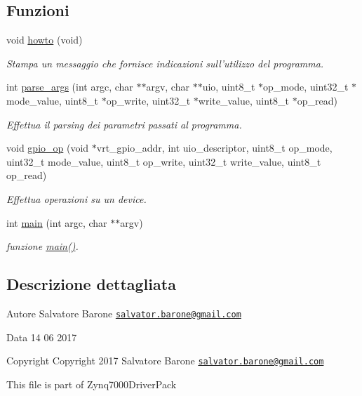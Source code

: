 \subsection*{Funzioni}
\begin{DoxyCompactItemize}
\item 
void \hyperlink{group___u_i_o-interrupt_ga05909651fa170a63e98e3f8e13451b7b}{howto} (void)
\begin{DoxyCompactList}\small\item\em Stampa un messaggio che fornisce indicazioni sull'utilizzo del programma. \end{DoxyCompactList}\item 
int \hyperlink{group___u_i_o-interrupt_gab6b18eb1bf7bc996599c06dc6dad8f53}{parse\+\_\+args} (int argc, char $\ast$$\ast$argv, char $\ast$$\ast$uio, uint8\+\_\+t $\ast$op\+\_\+mode, uint32\+\_\+t $\ast$mode\+\_\+value, uint8\+\_\+t $\ast$op\+\_\+write, uint32\+\_\+t $\ast$write\+\_\+value, uint8\+\_\+t $\ast$op\+\_\+read)
\begin{DoxyCompactList}\small\item\em Effettua il parsing dei parametri passati al programma. \end{DoxyCompactList}\item 
void \hyperlink{group___u_i_o-interrupt_ga78b676750c5d08c316cad35ec3963c53}{gpio\+\_\+op} (void $\ast$vrt\+\_\+gpio\+\_\+addr, int uio\+\_\+descriptor, uint8\+\_\+t op\+\_\+mode, uint32\+\_\+t mode\+\_\+value, uint8\+\_\+t op\+\_\+write, uint32\+\_\+t write\+\_\+value, uint8\+\_\+t op\+\_\+read)
\begin{DoxyCompactList}\small\item\em Effettua operazioni su un device. \end{DoxyCompactList}\item 
int \hyperlink{group___u_i_o-interrupt_ga3c04138a5bfe5d72780bb7e82a18e627}{main} (int argc, char $\ast$$\ast$argv)
\begin{DoxyCompactList}\small\item\em funzione \hyperlink{group___u_i_o-interrupt_ga3c04138a5bfe5d72780bb7e82a18e627}{main()}. \end{DoxyCompactList}\end{DoxyCompactItemize}


\subsection{Descrizione dettagliata}
\begin{DoxyAuthor}{Autore}
Salvatore Barone \href{mailto:salvator.barone@gmail.com}{\tt salvator.\+barone@gmail.\+com} 
\end{DoxyAuthor}
\begin{DoxyDate}{Data}
14 06 2017
\end{DoxyDate}
\begin{DoxyCopyright}{Copyright}
Copyright 2017 Salvatore Barone \href{mailto:salvator.barone@gmail.com}{\tt salvator.\+barone@gmail.\+com}
\end{DoxyCopyright}
This file is part of Zynq7000\+Driver\+Pack


